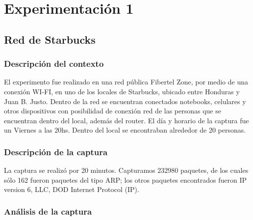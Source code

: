 \section{Experimentaci\'on 1}

\subsection{Red de Starbucks}

\subsubsection{Descripci\'on del contexto}
El experimento fue realizado en una red p\'ublica Fibertel Zone, por medio de una conexión WI-FI, en uno de los locales de Starbucks, ubicado entre Honduras y Juan B. Justo. Dentro de la red se encuentran conectados notebooks, celulares y otros dispositivos con posibilidad de conexi\'on red de las personas que se encuentran dentro del local, adem\'as del router. El día y horario de la captura fue un Viernes a las 20hs. Dentro del local se encontraban alrededor de 20 personas.

\subsubsection{Descripci\'on de la captura}
La captura se realiz\'o por 20 minutos. Capturamos 232980 paquetes, de los cuales s\'olo 162 fueron paquetes del tipo ARP; los otros paquetes encontrados fueron IP version 6, LLC, DOD Internet Protocol (IP).

\subsubsection{An\'alisis de la captura}






